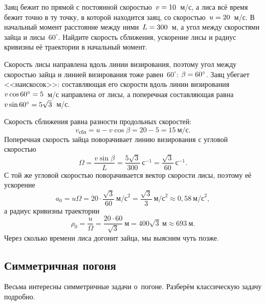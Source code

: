 \documentclass[../main.tex]{subfiles}
\begin{document}
\begin{example}
Заяц бежит по прямой с постоянной скоростью~$v \hm= 10$~м/с, а лиса всё время бежит
точно в ту точку, в которой находится заяц, со скоростью~$u \hm= 20$~м/с. В начальный
момент расстояние между ними~$L \hm= 300$~м, а угол между скоростями зайца и лисы~$60^\circ$.\label{ex:pur_fox} Найдите скорость сближения, ускорение лисы и радиус кривизны её
траектории в начальный момент.

Скорость лисы направлена вдоль линии визирования, поэтому угол между скоростью зайца
и линией визирования тоже равен~$60^\circ$: $\beta \hm= 60^\circ$. Заяц убегает <<наискосок>>:
составляющая его скорости вдоль линии визирования~$v\cos 60^\circ \hm= 5$~м/с направлена
от лисы, а поперечная составляющая равна~$v\sin 60^\circ \hm= 5\sqrt{3}$~м/с.

Скорость сближения равна разности продольных скоростей:
\[
v_{\text{сбл}} = u - v\cos\beta = 20 - 5 = 15~\text{м/с}.
\]
Поперечная скорость зайца поворачивает линию визирования с угловой скоростью
\[
\Omega = \frac{v\sin\beta}{L} = \frac{5\sqrt{3}}{300}~\text{с}^{-1} = \frac{\sqrt{3}}{60}~\text{с}^{-1}.
\]
С той же угловой скоростью поворачивается вектор скорости лисы, поэтому её ускорение
\[
a_0 = u\Omega = 20\cdot\frac{\sqrt{3}}{60}~\text{м/с}^2 = \frac{\sqrt{3}}{3}~\text{м/с}^2
\approx 0{,}58~\text{м/с}^2,
\]
а радиус кривизны траектории
\[
\rho_0 = \frac{u}{\Omega} = \frac{20\cdot 60}{\sqrt{3}}~\text{м} = 400\sqrt{3}~\text{м}
\approx 693~\text{м}.
\]
Через сколько времени лиса догонит зайца, мы выясним чуть позже.
\end{example}

\subsection{Симметричная погоня}

Весьма интересны симметричные задачи о~погоне. Разберём классическую задачу
подробно.
\end{document}
